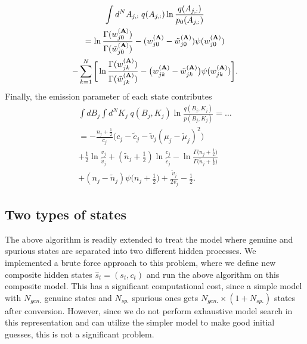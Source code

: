 \begin{multline}
  \int d^NA_{j,:}\;q(A_{j,:})\ln\frac{q(A_{j,:})}{p_0(A_{j,:})}\\
  =\ln\frac{\Gamma(w_{j0}^{(\mathbf{A})})}{\Gamma(\tilde w_{j0}^{(\mathbf{A})})}
    -(w_{j0}^{(\mathbf{A})}-\tilde w_{j0}^{(\mathbf{A})})\psi(w_{j0}^{(\mathbf{A})})\\
    -\sum_{k=1}^N\bigg[
      \ln\frac{\Gamma(w_{jk}^{(\mathbf{A})})}{\Gamma(\tilde w_{jk}^{(\mathbf{A})})}
      -\big(w_{jk}^{(\mathbf{A})}-\tilde w_{jk}^{(\mathbf{A})}\big)
      \psi(w_{jk}^{(\mathbf{A})})\bigg].
\end{multline}
Finally, the emission parameter of each state contributes
\begin{multline}\label{seq:KBKL}
  \int dB_j\int d^NK_j\;q(B_j,K_j)
  \ln\frac{q(B_j,K_j)}{p(B_j,K_j)}=\ldots\\
  =-\frac{n_j+\frac 12}{c_j}
    \Big(c_j-\tilde c_j-\tilde v_j(\mu_j-\tilde \mu_j)^2\Big)\\
    +\frac 12\ln\frac{v_j}{\tilde v_j}
    +(\tilde n_j+\frac 12)\ln\frac{c_j}{\tilde c_j}
    -\ln\frac{\Gamma\big(n_j+\frac 12\big)}{\Gamma\big(\tilde n_j+\frac 12\big)}\\
    +(n_j-\tilde n_j)\psi\big(n_j+\frac 12\big)
    +\frac{\tilde v_j}{2v_j}
    -\frac 12.
\end{multline}

\subsection{Two types of states}
The above algorithm is readily extended to treat the model where
genuine and spurious states are separated into two different hidden
processes. We implemented a brute force approach to this problem,
where we define new composite hidden states $\hat s_t=(s_t,c_t)$ and
run the above algorithm on this composite model. This has a
significant computational cost, since a simple model with $N_{gen.}$
genuine states and $N_{sp.}$ spurious ones gets
$N_{gen.}\times(1+N_{sp.})$ states after conversion. However, since we
do not perform exhaustive model search in this representation and can
utilize the simpler model to make good initial guesses, this is not a
significant problem.


